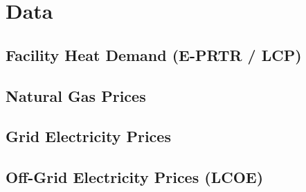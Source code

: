 \documentclass[12pt, a4paper]{article}
\begin{document}
\section{Data}
\label{sec:data}

\subsection{Facility Heat Demand (E-PRTR / LCP)}

\subsection{Natural Gas Prices}

\subsection{Grid Electricity Prices}

\subsection{Off-Grid Electricity Prices (LCOE)}
\end{document}

